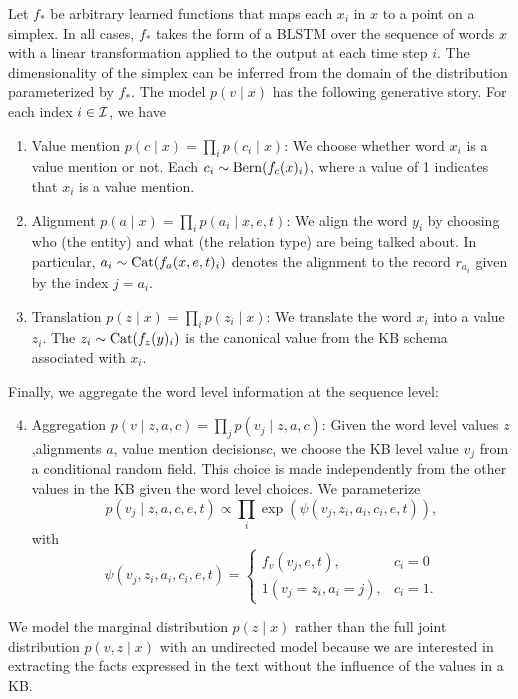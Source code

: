 \documentclass[12pt]{article}
\begin{document}
Let $f_*$ be arbitrary learned functions that maps each $x_i$ in $x$ to
a point on a simplex.
In all cases, $f_*$ takes the form of a BLSTM over the sequence of words $x$
with a linear transformation applied to the output at each time step $i$.
The dimensionality of the simplex can be inferred from the domain of the
distribution parameterized by $f_*$.
The model $p(v\mid x)$ has the following generative story.
For each index $i \in \mathcal{I}$, we have
\begin{enumerate}
\item Value mention $p(c \mid x) = \prod_i p(c_i \mid x)$: We choose whether word $x_i$
   is a value mention or not. Each $c_i \sim \mathrm{Bern}(f_c(x)_i)$, where a value of 1 indicates
   that $x_i$ is a value mention.
\item Alignment $p(a \mid x) = \prod_i p(a_i \mid x,e,t)$: We align the word $y_i$ by choosing who (the entity)
    and what (the relation type) are being talked about.
    In particular, $a_i\sim\mathrm{Cat}(f_a(x,e,t)_i)$ denotes the alignment to the record $r_{a_i}$
    given by the index $j = a_i$. 
\item Translation $p(z \mid x) = \prod_i p(z_i \mid x)$: We translate the word $x_i$ into a value $z_i$.
    The $z_i \sim \mathrm{Cat}(f_z(y)_i)$ is the canonical value from the KB schema 
    associated with $x_i$.
\end{enumerate}

Finally, we aggregate the word level information at the sequence level:
\begin{enumerate}
\setcounter{enumi}{3}
\item Aggregation $p(v \mid z,a,c) = \prod_j p(v_j \mid z,a,c)$:
    Given the word level values $z$,alignments $a$, value mention decisions$c$,
    we choose the KB level value $v_j$ from a conditional random field.
    This choice is made independently from the other values in the KB
    given the word level choices.
    We parameterize
    $$p(v_j \mid z,a,c,e,t) \propto \prod_i \exp(\psi(v_j, z_i, a_i, c_i,e,t)),$$
    with
    $$
    \psi(v_j, z_i, a_i, c_i,e,t) = \begin{cases}
    f_v(v_j,e,t), & c_i = 0 \\
    1(v_j = z_i, a_i = j), & c_i = 1.
    \end{cases}
    $$
\end{enumerate}

We model the marginal distribution $p(z \mid x)$ rather than
the full joint distribution $p(v,z\mid x)$ with an undirected model
because we are interested in extracting the facts expressed in the text
without the influence of the values in a KB.
\end{document}

